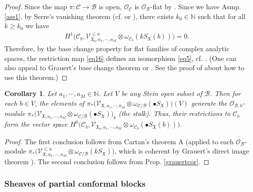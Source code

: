 \documentclass[11pt,b5paper,notitlepage]{article}
\theoremstyle{definition}
\theoremstyle{plain}
\newtheorem{co}[df]{Corollary}
\newcommand{\mc}{\mathcal}
\newcommand{\SV}{\mathscr{V}}
\newcommand{\blt}{\bullet}
\newcommand{\Nbb}{\mathbb N}
\newcommand{\<}{\left\langle}
\renewcommand{\>}{\right\rangle}
\newcommand{\MC}{\mathcal{C}}
\newcommand{\MB}{\mathcal{B}}
\newcommand{\fx}{\mathfrak{X}}
\numberwithin{equation}{subsection}
\begin{document}
\begin{proof}
Since the map $\pi:\mc C\rightarrow\mc B$ is open, $\mc O_{\mc C}$ is $\mc O_{\mc B}$-flat by \cite[Sec. 3.20]{Fis76}. Since we have Asmp. \ref{ass1}, by Serre's vanishing theorem (cf. \cite[Prop. 5.2.7]{Huy} or \cite[Thm. IV.2.1]{BaSt}), there exists $k_0\in\Nbb$ such that for all $k\geq k_0$ we have
\begin{align}\label{eq14}
H^1\big(\MC_b,\SV_{\fx_b,a_1,\cdots,a_M}^{\leq n}\otimes \omega_{\MC_b}(k S_\fx(b))\big)=0.
\end{align}
Therefore, by the base change property for flat families of complex analytic spaces, the restriction map \eqref{eq16} defines an isomorphism \eqref{eq5}, cf. \cite[Cor. III.3.9]{BaSt}. (One can also appeal to Grauert's base change theorem \cite[Thm. III.4.7]{GPR94} or \cite[Thm. III.4.12]{BaSt}. See the proof of \cite[Thm. 5.5]{Gui-sewingconvergence} about how to use this theorem.)
\end{proof}



\begin{co}\label{grauertcor2}
Let $a_1,\cdots,a_M\in \Nbb$. Let $V$ be any Stein open subset of $\mc B$. Then for each $b\in V$, the elements of $\pi_*\big(\SV_{\fx,a_1,\cdots,a_M}\otimes \omega_{\MC/\MB}(\blt S_\fx)\big)(V)$ generate the  $\mc O_{\mc B,b}$-module  $\pi_*\big(\SV_{\fx,a_1,\cdots,a_M}\otimes \omega_{\MC/\MB}(\blt S_\fx)\big)_b$ (the stalk). Thus, their restrictions to $\MC_b$ form the vector space $H^0\big(\MC_b,\SV_{\fx_b,a_1,\cdots,a_M}\otimes \omega_{\MC_b}(\blt S_\fx(b))\big)$.
\end{co}
\begin{proof}
The first conclusion follows from  Cartan's theorem A (applied to each $\mc O_{\mc B}$-module $\pi_*\big(\SV_{\fx,a_1,\cdots,a_M}^{\leq n}\otimes \omega_{\MC/\MB}(k S_\fx)\big)$, which is coherent by Grauert's direct image theorem \cite[Sec. 10.4]{GR84}). The second conclusion follows from Prop. \ref{grauertcor}.
\end{proof}


\subsubsection{Sheaves of partial conformal blocks}
\end{document}
